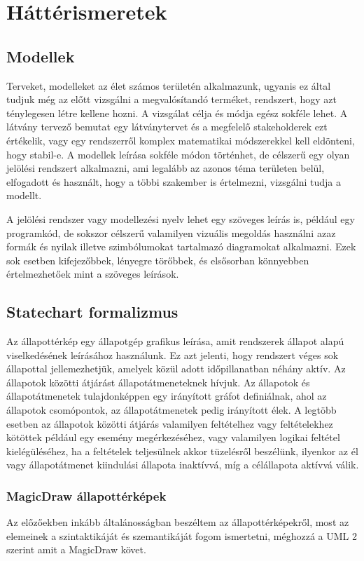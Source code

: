 \chapter{Háttérismeretek}
\section{Modellek}
Terveket, modelleket az élet számos területén alkalmazunk, ugyanis ez által tudjuk még az előtt vizsgálni a megvalósítandó terméket, rendszert, hogy azt ténylegesen létre kellene hozni. A vizsgálat célja és módja egész sokféle lehet. A látvány tervező bemutat egy látványtervet és a megfelelő stakeholderek ezt értékelik, vagy egy rendszerről komplex matematikai módszerekkel kell eldönteni, hogy stabil-e. A modellek leírása sokféle módon történhet, de célszerű egy olyan jelölési rendszert alkalmazni, ami legalább az azonos téma területen belül, elfogadott és használt, hogy a többi szakember is értelmezni, vizsgálni tudja a modellt.

A jelölési rendszer vagy modellezési nyelv lehet egy szöveges leírás is, például egy programkód, de sokszor célszerű valamilyen vizuális megoldás használni azaz formák és nyilak illetve  szimbólumokat tartalmazó diagramokat alkalmazni. Ezek sok esetben kifejezőbbek, lényegre törőbbek, és elsősorban könnyebben értelmezhetőek mint a szöveges leírások.

\section{Statechart formalizmus}
Az állapottérkép egy állapotgép grafikus leírása, amit rendszerek állapot alapú viselkedésének leírásához használunk. Ez azt jelenti, hogy rendszert véges sok állapottal jellemezhetjük, amelyek közül adott időpillanatban néhány aktív. Az állapotok közötti átjárást állapotátmeneteknek hívjuk. Az állapotok és állapotátmenetek tulajdonképpen egy irányított gráfot definiálnak, ahol az állapotok csomópontok, az állapotátmenetek pedig irányított élek. A legtöbb esetben az állapotok közötti átjárás valamilyen feltételhez vagy feltételekhez kötöttek például egy esemény megérkezéséhez, vagy valamilyen logikai feltétel kielégüléséhez, ha a feltételek teljesülnek akkor tüzelésről beszélünk, ilyenkor az él vagy állapotátmenet kiindulási állapota inaktívvá, míg a célállapota aktívvá válik.

\subsection{MagicDraw állapottérképek}
Az előzőekben inkább általánosságban beszéltem az állapottérképekről, most az elemeinek a szintaktikáját és szemantikáját fogom ismertetni, méghozzá a UML 2 szerint amit a MagicDraw követ.


